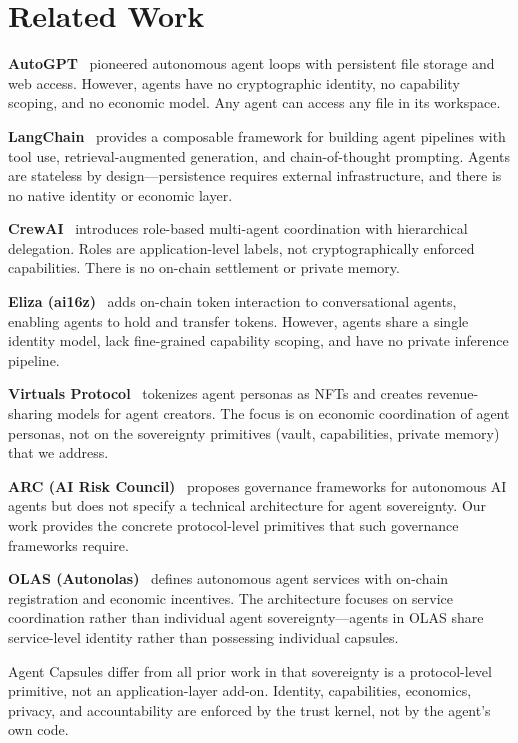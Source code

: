 \section{Related Work}
\label{sec:related}

\textbf{AutoGPT}~\cite{autogpt2023} pioneered autonomous agent loops with persistent file storage and web access. However, agents have no cryptographic identity, no capability scoping, and no economic model. Any agent can access any file in its workspace.

\textbf{LangChain}~\cite{langchain2023} provides a composable framework for building agent pipelines with tool use, retrieval-augmented generation, and chain-of-thought prompting. Agents are stateless by design---persistence requires external infrastructure, and there is no native identity or economic layer.

\textbf{CrewAI}~\cite{crewai2024} introduces role-based multi-agent coordination with hierarchical delegation. Roles are application-level labels, not cryptographically enforced capabilities. There is no on-chain settlement or private memory.

\textbf{Eliza (ai16z)}~\cite{ai16z2024eliza} adds on-chain token interaction to conversational agents, enabling agents to hold and transfer tokens. However, agents share a single identity model, lack fine-grained capability scoping, and have no private inference pipeline.

\textbf{Virtuals Protocol}~\cite{virtuals2024} tokenizes agent personas as NFTs and creates revenue-sharing models for agent creators. The focus is on economic coordination of agent personas, not on the sovereignty primitives (vault, capabilities, private memory) that we address.

\textbf{ARC (AI Risk Council)}~\cite{arc2024} proposes governance frameworks for autonomous AI agents but does not specify a technical architecture for agent sovereignty. Our work provides the concrete protocol-level primitives that such governance frameworks require.

\textbf{OLAS (Autonolas)}~\cite{olas2023} defines autonomous agent services with on-chain registration and economic incentives. The architecture focuses on service coordination rather than individual agent sovereignty---agents in OLAS share service-level identity rather than possessing individual capsules.

Agent Capsules differ from all prior work in that sovereignty is a protocol-level primitive, not an application-layer add-on. Identity, capabilities, economics, privacy, and accountability are enforced by the trust kernel, not by the agent's own code.


